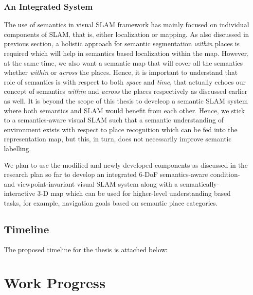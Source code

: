 \documentclass{article}
\begin{document}
\subsubsection{An Integrated System}
The use of semantics in visual SLAM framework has mainly focused on individual components of SLAM, that is, either localization or mapping. As also discussed in previous section, a holistic approach for semantic segmentation \emph{within} places is required which will help in semantics based localization within the map. However, at the same time, we also want a semantic map that will cover all the semantics whether \emph{within} or \emph{across} the places. Hence, it is important to understand that role of semantics is with respect to both \emph{space} and \emph{time}, that actually echoes our concept of semantics \emph{within} and \emph{across} the places respectively as discussed earlier as well. It is beyond the scope of this thesis to develeop a semantic SLAM system where both semantics and SLAM would benefit from each other. Hence, we stick to a semantics-aware visual SLAM such that a semantic understanding of environment exists with respect to place recognition which can be fed into the representation map, but this, in turn, does not necessarily improve semantic labelling.

We plan to use the modified and newly developed components as discussed in the research plan so far to develop an integrated 6-DoF semantics-aware condition- and viewpoint-invariant visual SLAM system along with a semantically-interactive 3-D map which can be used for higher-level understanding based tasks, for example, navigation goals based on semantic place categories.

\subsection{Timeline}
The proposed timeline for the thesis is attached below:

\begin{figure}[!htbp]
\centering
 \label{fig:Timeline}
\end{figure}


\section{Work Progress}
\end{document}
